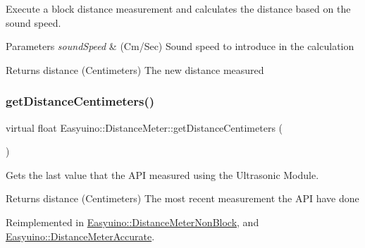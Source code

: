 Execute a block distance measurement and calculates the distance based on the sound speed. 


\begin{DoxyParams}{Parameters}
{\em sound\+Speed} & (Cm/\+Sec) Sound speed to introduce in the calculation \\
\hline
\end{DoxyParams}
\begin{DoxyReturn}{Returns}
distance (Centimeters) The new distance measured 
\end{DoxyReturn}
\mbox{\label{class_easyuino_1_1_distance_meter_a637cdd0d3e4f3bcf094704ae91e0c7c3}} 
\subsubsection{\texorpdfstring{get\+Distance\+Centimeters()}{getDistanceCentimeters()}}
{\footnotesize\ttfamily virtual float Easyuino\+::\+Distance\+Meter\+::get\+Distance\+Centimeters (\begin{DoxyParamCaption}{ }\end{DoxyParamCaption})\hspace{0.3cm}{\ttfamily [virtual]}}



Gets the last value that the A\+PI measured using the Ultrasonic Module. 

\begin{DoxyReturn}{Returns}
distance (Centimeters) The most recent measurement the A\+PI have done 
\end{DoxyReturn}


Reimplemented in \hyperlink{class_easyuino_1_1_distance_meter_non_block_a00419fc2c2ff7c587735063971aa7464}{Easyuino\+::\+Distance\+Meter\+Non\+Block}, and \hyperlink{class_easyuino_1_1_distance_meter_accurate_a4de44a347db0bebbf5d74f12397cd4d9}{Easyuino\+::\+Distance\+Meter\+Accurate}.

\mbox{\label{class_easyuino_1_1_distance_meter_a4e3c650c54382d9af6bca51dcac4e7a3}} 
